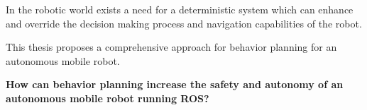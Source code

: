 In the robotic world exists a need for a deterministic system which can enhance and override the decision making process and navigation capabilities of the robot. 

This thesis proposes a comprehensive approach for behavior planning for an autonomous mobile robot.  


\textbf{How can behavior planning increase the safety and autonomy of an autonomous mobile robot running ROS?}


	
	


